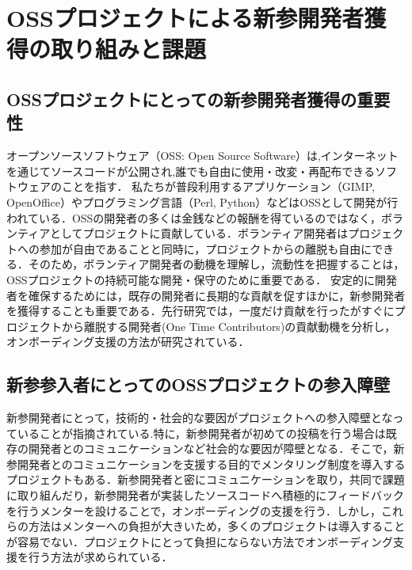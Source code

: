 \documentclass[11pt]{jreport}
\begin{document}
\section{OSSプロジェクトによる新参開発者獲得の取り組みと課題}

\subsection{OSSプロジェクトにとっての新参開発者獲得の重要性}


オープンソースソフトウェア（OSS: Open Source Software）は,インターネットを通じてソースコードが公開され,誰でも自由に使用・改変・再配布できるソフトウェアのことを指す．
私たちが普段利用するアプリケーション（GIMP, OpenOffice）やプログラミング言語（Perl, Python）などはOSSとして開発が行われている．OSSの開発者の多くは金銭などの報酬を得ているのではなく，ボランティアとしてプロジェクトに貢献している\cite{definding}．ボランティア開発者はプロジェクトへの参加が自由であることと同時に，プロジェクトからの離脱も自由にできる．そのため，ボランティア開発者の動機を理解し，流動性を把握することは，OSSプロジェクトの持続可能な開発・保守のために重要である．
安定的に開発者を確保するためには，既存の開発者に長期的な貢献を促すほかに，新参開発者を獲得することも重要である．先行研究\cite{OTC}では，一度だけ貢献を行ったがすぐにプロジェクトから離脱する開発者(One Time Contributors)の貢献動機を分析し，オンボーディング支援の方法が研究されている．

\subsection{新参参入者にとってのOSSプロジェクトの参入障壁}
新参開発者にとって，技術的・社会的な要因がプロジェクトへの参入障壁となっていることが指摘されている\cite{sosial}.特に，新参開発者が初めての投稿を行う場合は既存の開発者とのコミュニケーションなど社会的な要因が障壁となる\cite{social barries}．そこで，新参開発者とのコミュニケーションを支援する目的でメンタリング制度\cite{menter1}\cite{menter2}を導入するプロジェクトもある．新参開発者と密にコミュニケーションを取り，共同で課題に取り組んだり，新参開発者が実装したソースコードへ積極的にフィードバックを行うメンターを設けることで，オンボーディングの支援を行う．しかし，これらの方法はメンターへの負担が大きいため，多くのプロジェクトは導入することが容易でない．プロジェクトにとって負担にならない方法でオンボーディング支援を行う方法が求められている．
\end{document}
